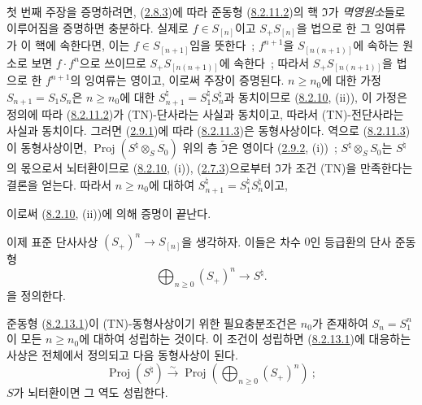 첫 번째 주장을 증명하려면, (\hyperref[II.2.8.3-ko]{2.8.3})에 따라
준동형 (\hyperref[II.8.2.11.2-ko]{8.2.11.2})의 핵 $\mathfrak{I}$가
\emph{멱영원소}들로 이루어짐을 증명하면 충분하다. 실제로
$f\in S_{[n]}$이고 $S_+S_{[n]}$을 법으로 한 그 잉여류가 이 핵에
속한다면, 이는 $f\in S_{[n+1]}$임을 뜻한다~;
$f^{n+1}$을 $S_{[n(n+1)]}$에 속하는 원소로 보면
$f\cdot f^n$으로 쓰이므로 $S_+S_{[n(n+1)]}$에 속한다~; 따라서
$S_+S_{[n(n+1)]}$을 법으로 한 $f^{n+1}$의 잉여류는 영이고, 이로써
주장이 증명된다. $n\geq n_0$에 대한 가정
$S_{n+1}=S_1S_n$은 $n\geq n_0$에 대한
$S_{n+1}^{\natural}=S_1^{\natural}S_n^{\natural}$과 동치이므로
(\hyperref[II.8.2.10-ko]{8.2.10}, (ii)), 이 가정은 정의에 따라
(\hyperref[II.8.2.11.2-ko]{8.2.11.2})가 (TN)-단사라는 사실과 동치이고,
따라서 (TN)-전단사라는 사실과 동치이다. 그러면
(\hyperref[II.2.9.1-ko]{2.9.1})에 따라
(\hyperref[II.8.2.11.3-ko]{8.2.11.3})은 동형사상이다. 역으로
(\hyperref[II.8.2.11.3-ko]{8.2.11.3})이 동형사상이면,
$\operatorname{Proj}(S^{\natural}\otimes_S S_0)$ 위의 층
$\widetilde{\mathfrak{I}}$은 영이다
(\hyperref[II.2.9.2-ko]{2.9.2}, (i))~;
$S^{\natural}\otimes_S S_0$는 $S^{\natural}$의 몫으로서 뇌터환이므로
(\hyperref[II.8.2.10-ko]{8.2.10}, (i)),
(\hyperref[II.2.7.3-ko]{2.7.3})으로부터 $\mathfrak{I}$가 조건 (TN)을
만족한다는 결론을 얻는다. 따라서 $n\geq n_0$에 대하여
$S_{n+1}^{\natural}=S_1^{\natural}S_n^{\natural}$이고,

이로써 (\hyperref[II.8.2.10-ko]{8.2.10}, (ii))에 의해 증명이 끝난다.

\begin{env}[8.2.13]
\label{II.8.2.13-ko}
이제 표준 단사사상 $(S_+)^n\to S_{[n]}$을 생각하자. 이들은 차수 $0$인
등급환의 단사 준동형
\begin{equation}
\label{II.8.2.13.1-ko}
  \bigoplus_{n\geq0}(S_+)^n\to S^{\natural}.
\tag{8.2.13.1}
\end{equation}
을 정의한다.
\end{env}

\begin{proposition}[8.2.14]
\label{II.8.2.14-ko}
준동형 (\hyperref[II.8.2.13.1-ko]{8.2.13.1})이 (TN)-동형사상이기 위한
필요충분조건은 $n_0$가 존재하여 $S_n=S_1^n$이 모든 $n\geq n_0$에
대하여 성립하는 것이다. 이 조건이 성립하면
(\hyperref[II.8.2.13.1-ko]{8.2.13.1})에 대응하는 사상은 전체에서
정의되고 다음 동형사상이 된다.
\[
  \operatorname{Proj}(S^{\natural})\xrightarrow{\sim}
  \operatorname{Proj}\left(\bigoplus_{n\geq0}(S_+)^n\right)~;
\]
$S$가 뇌터환이면 그 역도 성립한다.
\end{proposition}


